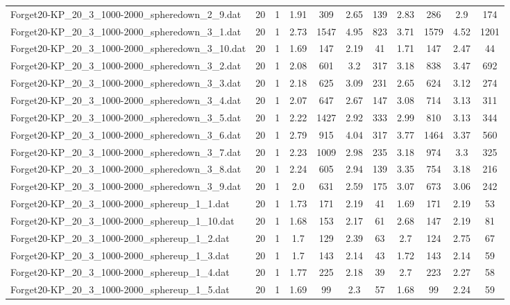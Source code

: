 \begin{table}[!ht]
\begin{tabular}{lcccccccccc}
Forget20-KP\_20\_3\_1000-2000\_spheredown\_2\_9.dat & 20 & 1 & 1.91 & 309 & 2.65 & 139 & 2.83 & 286 & 2.9 & 174 \\
Forget20-KP\_20\_3\_1000-2000\_spheredown\_3\_1.dat & 20 & 1 & 2.73 & 1547 & 4.95 & 823 & 3.71 & 1579 & 4.52 & 1201 \\
Forget20-KP\_20\_3\_1000-2000\_spheredown\_3\_10.dat & 20 & 1 & 1.69 & 147 & 2.19 & 41 & 1.71 & 147 & 2.47 & 44 \\
Forget20-KP\_20\_3\_1000-2000\_spheredown\_3\_2.dat & 20 & 1 & 2.08 & 601 & 3.2 & 317 & 3.18 & 838 & 3.47 & 692 \\
Forget20-KP\_20\_3\_1000-2000\_spheredown\_3\_3.dat & 20 & 1 & 2.18 & 625 & 3.09 & 231 & 2.65 & 624 & 3.12 & 274 \\
Forget20-KP\_20\_3\_1000-2000\_spheredown\_3\_4.dat & 20 & 1 & 2.07 & 647 & 2.67 & 147 & 3.08 & 714 & 3.13 & 311 \\
Forget20-KP\_20\_3\_1000-2000\_spheredown\_3\_5.dat & 20 & 1 & 2.22 & 1427 & 2.92 & 333 & 2.99 & 810 & 3.13 & 344 \\
Forget20-KP\_20\_3\_1000-2000\_spheredown\_3\_6.dat & 20 & 1 & 2.79 & 915 & 4.04 & 317 & 3.77 & 1464 & 3.37 & 560 \\
Forget20-KP\_20\_3\_1000-2000\_spheredown\_3\_7.dat & 20 & 1 & 2.23 & 1009 & 2.98 & 235 & 3.18 & 974 & 3.3 & 325 \\
Forget20-KP\_20\_3\_1000-2000\_spheredown\_3\_8.dat & 20 & 1 & 2.24 & 605 & 2.94 & 139 & 3.35 & 754 & 3.18 & 216 \\
Forget20-KP\_20\_3\_1000-2000\_spheredown\_3\_9.dat & 20 & 1 & 2.0 & 631 & 2.59 & 175 & 3.07 & 673 & 3.06 & 242 \\
Forget20-KP\_20\_3\_1000-2000\_sphereup\_1\_1.dat & 20 & 1 & 1.73 & 171 & 2.19 & 41 & 1.69 & 171 & 2.19 & 53 \\
Forget20-KP\_20\_3\_1000-2000\_sphereup\_1\_10.dat & 20 & 1 & 1.68 & 153 & 2.17 & 61 & 2.68 & 147 & 2.19 & 81 \\
Forget20-KP\_20\_3\_1000-2000\_sphereup\_1\_2.dat & 20 & 1 & 1.7 & 129 & 2.39 & 63 & 2.7 & 124 & 2.75 & 67 \\
Forget20-KP\_20\_3\_1000-2000\_sphereup\_1\_3.dat & 20 & 1 & 1.7 & 143 & 2.14 & 43 & 1.72 & 143 & 2.14 & 59 \\
Forget20-KP\_20\_3\_1000-2000\_sphereup\_1\_4.dat & 20 & 1 & 1.77 & 225 & 2.18 & 39 & 2.7 & 223 & 2.27 & 58 \\
Forget20-KP\_20\_3\_1000-2000\_sphereup\_1\_5.dat & 20 & 1 & 1.69 & 99 & 2.3 & 57 & 1.68 & 99 & 2.24 & 59 \\

\end{tabular}
\end{table}
